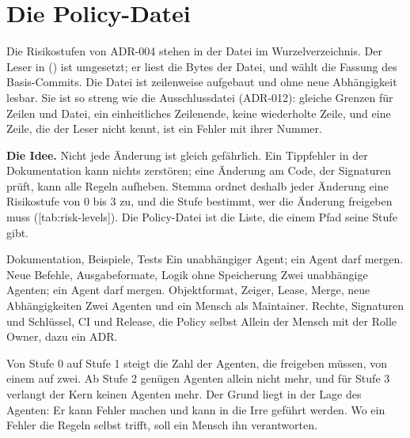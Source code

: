 \section[sec:policy-file]{Die Policy-Datei}

Die Risikostufen von ADR-004 stehen in der Datei  im Wurzelverzeichnis.
Der Leser in  () ist umgesetzt;
er liest die Bytes der Datei, und  wählt die Fassung des
Basis-Commits.
Die Datei ist zeilenweise aufgebaut und ohne neue Abhängigkeit lesbar.
Sie ist so streng wie die Ausschlussdatei  (ADR-012):
gleiche Grenzen für Zeilen und Datei, ein einheitliches Zeilenende, keine wiederholte Zeile,
und eine Zeile, die der Leser nicht kennt, ist ein Fehler mit ihrer Nummer.

{\bf Die Idee.}
Nicht jede Änderung ist gleich gefährlich.
Ein Tippfehler in der Dokumentation kann nichts zerstören;
eine Änderung am Code, der Signaturen prüft, kann alle Regeln aufheben.
Stemma ordnet deshalb jeder Änderung eine Risikostufe von 0 bis 3 zu,
und die Stufe bestimmt, wer die Änderung freigeben muss ([tab:risk-levels]).
Die Policy-Datei ist die Liste, die einem Pfad seine Stufe gibt.

\startplacetable[title={Die vier Risikostufen aus Sicht der Beteiligten},reference=tab:risk-levels]
\startxtable[frame=off,option=stretch]
\startxrow[topframe=on,bottomframe=on]
 \stopxcell
{} \stopxcell
{} \stopxcell
\stopxrow
\startxrow
{} \stopxcell
\startxcell Dokumentation, Beispiele, Tests \stopxcell
\startxcell Ein unabhängiger Agent; ein Agent darf mergen. \stopxcell
\stopxrow
\startxrow
{} \stopxcell
\startxcell Neue Befehle, Ausgabeformate, Logik ohne Speicherung \stopxcell
\startxcell Zwei unabhängige Agenten; ein Agent darf mergen. \stopxcell
\stopxrow
\startxrow
{} \stopxcell
\startxcell Objektformat, Zeiger, Lease, Merge, neue Abhängigkeiten \stopxcell
\startxcell Zwei Agenten und ein Mensch als Maintainer. \stopxcell
\stopxrow
\startxrow[bottomframe=on]
 \stopxcell
\startxcell Rechte, Signaturen und Schlüssel, CI und Release, die Policy selbst \stopxcell
\startxcell Allein der Mensch mit der Rolle Owner, dazu ein ADR. \stopxcell
\stopxrow
\stopxtable
\stopplacetable

Von Stufe 0 auf Stufe 1 steigt die Zahl der Agenten, die freigeben müssen, von einem auf zwei.
Ab Stufe 2 genügen Agenten allein nicht mehr, und für Stufe 3 verlangt der Kern
keinen Agenten mehr.
Der Grund liegt in der Lage des Agenten:
Er kann Fehler machen und kann in die Irre geführt werden.
Wo ein Fehler die Regeln selbst trifft, soll ein Mensch ihn verantworten.

